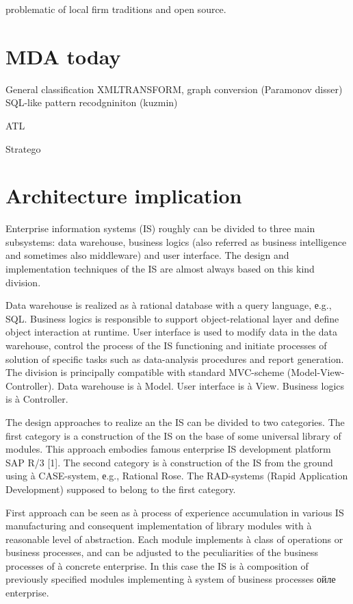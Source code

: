 \documentclass{intech}
\begin{document}
problematic of local firm traditions and open source.

\section{MDA today}
\label{sec:mda-today}

General classification XMLTRANSFORM, graph conversion (Paramonov disser) SQL-like pattern recodgniniton (kuzmin)

ATL

Stratego



\section{Architecture implication}
\label{sec:arch-imp}

Enterprise information systems (IS) roughly can be divided to three main subsystems: data warehouse, business logics (also referred as business intelligence and sometimes also middleware) and user interface. The design and implementation techniques of the IS are almost always based on this kind division.

Data warehouse is realized as à rational database with a query language, е.g., SQL. Business logics is responsible to support object-relational layer and define object interaction at runtime. User interface is used to modify data in the data warehouse, control the process of the IS functioning and initiate processes of solution of specific tasks such as data-analysis procedures and report generation. The division is principally compatible with standard MVC-scheme (Model-View-Controller). Data warehouse is à Model. User interface is à View. Business logics is à Controller.

The design approaches to realize an the IS can be divided to two categories. The first category is a construction of the IS on the base of some universal library of modules. This approach embodies famous enterprise IS development platform SAP R/3 [1]. The second category is à construction of the IS from the ground using à CASE-system, е.g., Rational Rose. The RAD-systems (Rapid Application Development) supposed to belong to the first category.

First approach can be seen as à process of experience accumulation in various IS manufacturing and consequent implementation of library modules with à reasonable level of abstraction. Each module implements à class of operations or business processes, and can be adjusted to the peculiarities of the business processes of à concrete enterprise. In this case the IS is à composition of previously specified modules implementing à system of business processes ойле enterprise.
\end{document}
